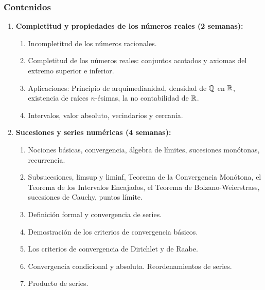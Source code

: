 \begin{refsection}
\subsubsection*{Contenidos}

\begin{enumerate}
\item \textbf{Completitud y propiedades de los números reales (2 semanas):} 
\begin{enumerate}
    \item Incompletitud de los números racionales.
    \item Completitud de los números reales: conjuntos acotados y axiomas del extremo superior e inferior.
    \item Aplicaciones: Principio de arquimedianidad, densidad de $\mathbb{Q}$ en $\mathbb{R}$, existencia de raíces $n$-ésimas, la no contabilidad de $\mathbb{R}$.
    \item Intervalos, valor absoluto, vecindarios y cercanía. 
\end{enumerate}

\item \textbf{Sucesiones y series numéricas (4 semanas):} 
\begin{enumerate}
    \item Nociones básicas, convergencia, álgebra de límites, sucesiones monótonas, recurrencia.
    \item Subsucesiones, limsup y liminf, Teorema de la Convergencia Monótona, el Teorema de los Intervalos Encajados, el Teorema de Bolzano-Weierstrass, sucesiones de Cauchy, puntos límite.
    \item Definición formal y convergencia de series.
    \item Demostración de los criterios de convergencia básicos.
    \item Los criterios de convergencia de Dirichlet y de Raabe.
    \item Convergencia condicional y absoluta. Reordenamientos de series.
    \item Producto de series.
\end{enumerate}


\end{enumerate}
\end{refsection}
